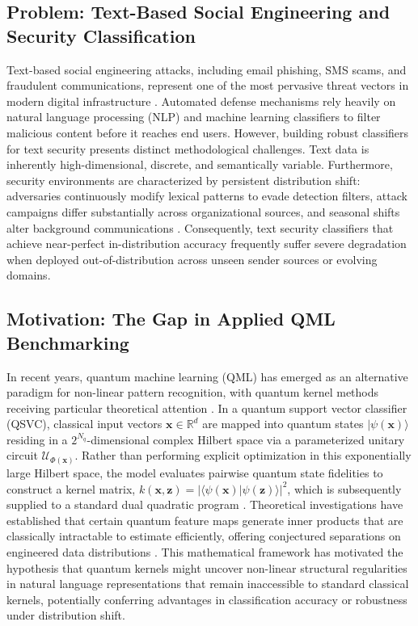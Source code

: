 \documentclass{article}
\begin{document}
\subsection{Problem: Text-Based Social Engineering and Security Classification}
Text-based social engineering attacks, including email phishing, SMS scams, and fraudulent communications, represent one of the most pervasive threat vectors in modern digital infrastructure \cite{alsallami2023empirical,ren2022generating,ammar2026quantum}. Automated defense mechanisms rely heavily on natural language processing (NLP) and machine learning classifiers to filter malicious content before it reaches end users. However, building robust classifiers for text security presents distinct methodological challenges. Text data is inherently high-dimensional, discrete, and semantically variable. Furthermore, security environments are characterized by persistent distribution shift: adversaries continuously modify lexical patterns to evade detection filters, attack campaigns differ substantially across organizational sources, and seasonal shifts alter background communications \cite{alsallami2023empirical,cova2008detection,verma2017detecting}. Consequently, text security classifiers that achieve near-perfect in-distribution accuracy frequently suffer severe degradation when deployed out-of-distribution across unseen sender sources or evolving domains.

\subsection{Motivation: The Gap in Applied QML Benchmarking}
In recent years, quantum machine learning (QML) has emerged as an alternative paradigm for non-linear pattern recognition, with quantum kernel methods receiving particular theoretical attention \cite{havlicek2019supervised,schuld2019quantum}. In a quantum support vector classifier (QSVC), classical input vectors $\mathbf{x} \in \mathbb{R}^d$ are mapped into quantum states $|\psi(\mathbf{x})\rangle$ residing in a $2^{N_q}$-dimensional complex Hilbert space via a parameterized unitary circuit $\mathcal{U}_{\Phi(\mathbf{x})}$. Rather than performing explicit optimization in this exponentially large Hilbert space, the model evaluates pairwise quantum state fidelities to construct a kernel matrix, $k(\mathbf{x}, \mathbf{z}) = |\langle \psi(\mathbf{x}) | \psi(\mathbf{z}) \rangle|^2$, which is subsequently supplied to a standard dual quadratic program \cite{cortes1995support,havlicek2019supervised}. Theoretical investigations have established that certain quantum feature maps generate inner products that are classically intractable to estimate efficiently, offering conjectured separations on engineered data distributions \cite{huang2021power,liu2021rigorous}. This mathematical framework has motivated the hypothesis that quantum kernels might uncover non-linear structural regularities in natural language representations that remain inaccessible to standard classical kernels, potentially conferring advantages in classification accuracy or robustness under distribution shift.
\end{document}
